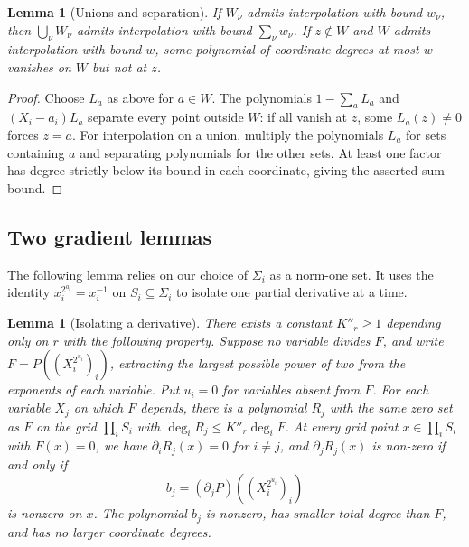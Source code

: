 \documentclass[11pt,letterpaper]{article}
\renewcommand{\le}{\leqslant}
\renewcommand{\ge}{\geqslant}
\newtheorem{lemma}[theorem]{Lemma}
\theoremstyle{definition}
\theoremstyle{remark}
\begin{document}
\begin{lemma}[Unions and separation]\label{lem:finite-union}
If $W_\nu$ admits interpolation with bound $w_\nu$, then
$\bigcup_\nu W_\nu$ admits interpolation with bound $\sum_\nu w_\nu$.
If $z\notin W$ and $W$ admits interpolation with bound $w$, some
polynomial of coordinate degrees at most $w$ vanishes on $W$
but not at $z$.
\end{lemma}
\begin{proof}
Choose $L_a$ as above for $a\in W$. The polynomials
$1-\sum_aL_a$ and $(X_i-a_i)L_a$ separate every point outside $W$:
if all vanish at $z$, some $L_a(z)\ne0$ forces $z=a$.
For interpolation on a union, multiply the polynomials $L_a$ for sets
containing $a$ and separating polynomials for the other sets.
At least one factor has degree strictly below its bound in each
coordinate, giving the asserted sum bound.
\end{proof}

\subsection{Two gradient lemmas}
\label{sec:B2}
The following lemma relies on our choice of $\Sigma_i$ as a norm-one set. It uses the identity $x_i^{2^{a_i}}=x_i^{-1}$ on
$S_i\subseteq\Sigma_i$ to isolate one partial derivative at a time.

\begin{lemma}[Isolating a derivative]\label{arb:axis-crt}\label{lem:CRT}
There exists a constant $K''_r \ge 1$ depending only on $r$ with the following property.
Suppose no variable divides $F$, and write
$F=P((X_i^{2^{u_i}})_i)$, extracting the largest possible power
of two from the exponents of each variable. Put $u_i=0$ for
variables absent from $F$.
For each variable $X_j$ on which $F$ depends, there is a polynomial
$R_j$ with the same zero set as $F$ on the grid $\prod_i S_i$ with $\deg_iR_j\le K''_r\deg_iF$.
At every grid point $x \in \prod_i S_i$ with $F(x)=0$, we have $\partial_iR_j(x)=0$ for $i\ne j$, and
$\partial_j R_j(x)$ is non-zero if and only if
\[
 b_j=(\partial_jP)((X_i^{2^{u_i}})_i)
\]
is nonzero on $x$. The polynomial $b_j$ is nonzero, has smaller total
degree than $F$, and has no larger coordinate degrees.
\end{lemma}
\end{document}
